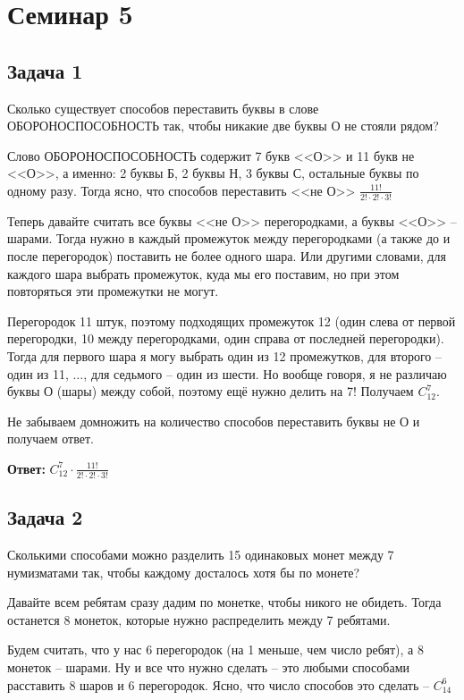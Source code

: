 
\section{Семинар 5}

\subsection{Задача 1}

Сколько существует способов переставить буквы в слове ОБОРОНОСПОСОБНОСТЬ
так, чтобы никакие две буквы О не стояли рядом?

Слово ОБОРОНОСПОСОБНОСТЬ содержит 7 букв <<О>> и 11 букв не <<О>>, а именно: 2 буквы Б, 2 буквы Н, 3 буквы С, остальные буквы по одному разу. Тогда ясно, что способов переставить <<не О>> $\frac{11!}{2! \cdot 2! \cdot 3!}$

Теперь давайте считать все буквы <<не О>> перегородками, а буквы <<О>> -- шарами. Тогда нужно в каждый промежуток между перегородками (а также до и после перегородок) поставить не более одного шара. Или другими словами, для каждого шара выбрать промежуток, куда мы его поставим, но при этом повторяться эти промежутки не могут.

Перегородок 11 штук, поэтому подходящих промежуток 12 (один слева от первой перегородки, 10 между перегородками, один справа от последней перегородки). Тогда для первого шара я могу выбрать один из 12 промежутков, для второго -- один из 11, $\ldots$, для седьмого -- один из шести. Но вообще говоря, я не различаю буквы О (шары) между собой, поэтому ещё нужно делить на 7! Получаем $C^7_{12}$.

Не забываем домножить на количество способов переставить буквы не О и получаем ответ.

\textbf{Ответ:} $C^7_{12} \cdot \frac{11!}{2! \cdot 2! \cdot 3!}$

\subsection{Задача 2}

Сколькими способами можно разделить 15 одинаковых монет между 7 нумизматами
так, чтобы каждому досталось хотя бы по монете?

Давайте всем ребятам сразу дадим по монетке, чтобы никого не обидеть. Тогда останется 8 монеток, которые нужно распределить между 7 ребятами.

Будем считать, что у нас 6 перегородок (на 1 меньше, чем число ребят), а 8 монеток -- шарами. Ну и все что нужно сделать -- это любыми способами расставить 8 шаров и 6 перегородок. Ясно, что число способов это сделать -- $C^6_{14}$


